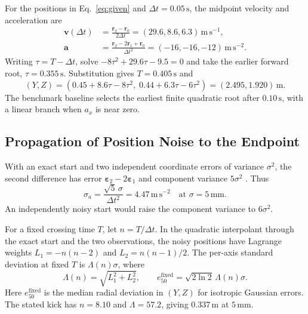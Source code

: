 \documentclass[11pt,a4paper]{article}
\begin{document}
For the positions in Eq.~\eqref{eq:given} and $\Delta t=0.05\,\mathrm{s}$, the midpoint velocity and acceleration are
\begin{align}
  \mathbf v(\Delta t)&=\frac{\mathbf r_2-\mathbf r_0}{2\Delta t}=(29.6,8.6,6.3)\,\mathrm{m\,s^{-1}},\label{eq:baseline}\\
  \mathbf a&=\frac{\mathbf r_2-2\mathbf r_1+\mathbf r_0}{\Delta t^2}=(-16,-16,-12)\,\mathrm{m\,s^{-2}}.
\end{align}
Writing $\tau=T-\Delta t$, solve $-8\tau^2+29.6\tau-9.5=0$ and take the earlier forward root, $\tau=0.355\,\mathrm{s}$. Substitution gives $T=0.405\,\mathrm{s}$ and
\begin{equation}
  (Y,Z)=(0.45+8.6\tau-8\tau^2,\;0.44+6.3\tau-6\tau^2)=(2.495,1.920)\,\mathrm{m}.
  \label{eq:baselineYZ}
\end{equation}
The benchmark baseline selects the earliest finite quadratic root after $0.10\,\mathrm{s}$, with a linear branch when $a_x$ is near zero.

\subsection{Propagation of Position Noise to the Endpoint}

With an exact start and two independent coordinate errors of variance $\sigma^2$, the second difference has error $\boldsymbol\varepsilon_2-2\boldsymbol\varepsilon_1$ and component variance $5\sigma^2$ \cite{gum2008}. Thus
\begin{equation}
  \sigma_a=\frac{\sqrt{5}\,\sigma}{\Delta t^2}=4.47\,\mathrm{m\,s^{-2}}
  \quad\text{at }\sigma=5\,\mathrm{mm}.
  \label{eq:sigmaa}
\end{equation}
An independently noisy start would raise the component variance to $6\sigma^2$.

For a fixed crossing time $T$, let $n=T/\Delta t$. In the quadratic interpolant through the exact start and the two observations, the noisy positions have Lagrange weights $L_1=-n(n-2)$ and $L_2=n(n-1)/2$. The per-axis standard deviation at fixed $T$ is $\Lambda(n)\sigma$, where
\begin{equation}
  \Lambda(n)=\sqrt{L_1^2+L_2^2},\qquad
  e_{50}^{\mathrm{fixed}}=\sqrt{2\ln 2}\,\Lambda(n)\sigma .
  \label{eq:noise-amplification}
\end{equation}
Here $e_{50}^{\mathrm{fixed}}$ is the median radial deviation in $(Y,Z)$ for isotropic Gaussian errors. The stated kick has $n=8.10$ and $\Lambda=57.2$, giving $0.337\,\mathrm{m}$ at $5\,\mathrm{mm}$.
\end{document}
